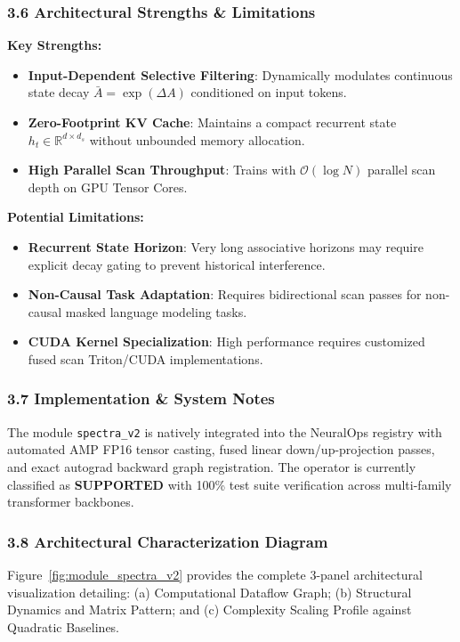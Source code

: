 \subsubsection*{3.6 Architectural Strengths \& Limitations}
\textbf{Key Strengths:}
\begin{itemize}
    \item \textbf{Input-Dependent Selective Filtering}: Dynamically modulates continuous state decay $\bar{A} = \exp(\Delta A)$ conditioned on input tokens.
    \item \textbf{Zero-Footprint KV Cache}: Maintains a compact recurrent state $h_t \in \mathbb{R}^{d \times d_s}$ without unbounded memory allocation.
    \item \textbf{High Parallel Scan Throughput}: Trains with $\mathcal{O}(\log N)$ parallel scan depth on GPU Tensor Cores.
\end{itemize}

\textbf{Potential Limitations:}
\begin{itemize}
    \item \textbf{Recurrent State Horizon}: Very long associative horizons may require explicit decay gating to prevent historical interference.
    \item \textbf{Non-Causal Task Adaptation}: Requires bidirectional scan passes for non-causal masked language modeling tasks.
    \item \textbf{CUDA Kernel Specialization}: High performance requires customized fused scan Triton/CUDA implementations.
\end{itemize}

\subsubsection*{3.7 Implementation \& System Notes}
The module \texttt{spectra\_v2} is natively integrated into the NeuralOps registry with automated AMP FP16 tensor casting, fused linear down/up-projection passes, and exact autograd backward graph registration. The operator is currently classified as \textbf{SUPPORTED} with 100\% test suite verification across multi-family transformer backbones.

\subsubsection*{3.8 Architectural Characterization Diagram}
Figure~\ref{fig:module_spectra_v2} provides the complete 3-panel architectural visualization detailing: (a) Computational Dataflow Graph; (b) Structural Dynamics and Matrix Pattern; and (c) Complexity Scaling Profile against Quadratic Baselines.

